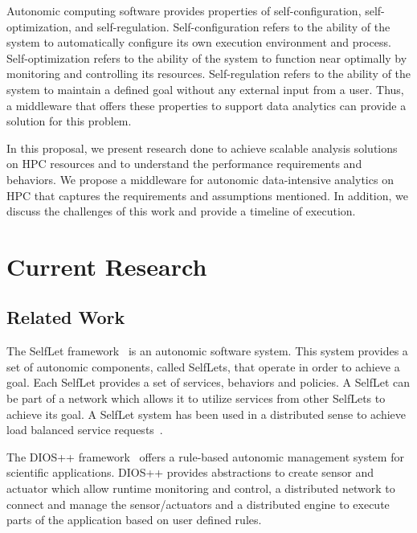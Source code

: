
Autonomic computing software provides properties of self-configuration, self-optimization, and self-regulation. Self-configuration refers to the ability of the system to automatically configure its own execution environment and process. Self-optimization refers to the ability of the system to function near optimally by monitoring and controlling its resources. Self-regulation refers to the ability of the system to maintain a defined goal without any external input from a user. Thus, a middleware that offers these properties to support data analytics can provide a solution for this problem.

In this proposal, we present research done to achieve scalable analysis solutions on HPC resources and to understand the performance requirements and behaviors. We propose a middleware for autonomic data-intensive analytics on HPC that captures the requirements and assumptions mentioned. In addition, we discuss the challenges of this work and provide a timeline of execution.

\section{Current Research}

\subsection{Related Work}

The SelfLet framework~\cite{bindelli2008building} is an autonomic software system. This system provides a set of autonomic components, called SelfLets, that operate in order to achieve a goal. Each SelfLet provides a set of services, behaviors and policies. A SelfLet can be part of a network which allows it to utilize services from other SelfLets to achieve its goal. A SelfLet system has been used in a distributed sense to achieve load balanced service requests~\cite{calcavecchia2010emergence}.

The DIOS++ framework~\cite{liu2003dios} offers a rule-based autonomic management system for scientific applications. DIOS++ provides abstractions to create sensor and actuator which allow runtime monitoring and control, a distributed network to connect and manage the sensor/actuators and a distributed engine to execute parts of the application based on user defined rules.

